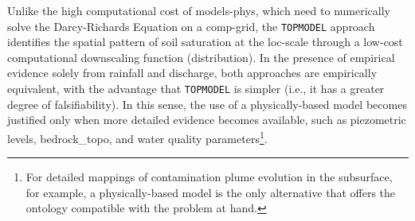 \documentclass[./main_en.tex]{subfiles}
\begin{document}
\par Unlike the high computational cost of \gls{models-phys}, which need to numerically solve the Darcy-Richards Equation on a \gls{comp-grid}, the \texttt{TOPMODEL} approach identifies the spatial pattern of soil saturation at the \gls{loc-scale} through a low-cost computational \gls{downscaling} function (distribution). In the presence of empirical evidence solely from rainfall and discharge, both approaches are empirically equivalent, with the advantage that \texttt{TOPMODEL} is simpler (i.e., it has a greater degree of falsifiability). In this sense, the use of a physically-based \gls{model} becomes justified only when more detailed evidence becomes available, such as piezometric levels, \gls{bedrock_topo}, and water quality \gls{parameters}\footnote{For detailed mappings of contamination plume evolution in the subsurface, for example, a physically-based \gls{model} is the only alternative that offers the ontology compatible with the problem at hand.}.
\end{document}
